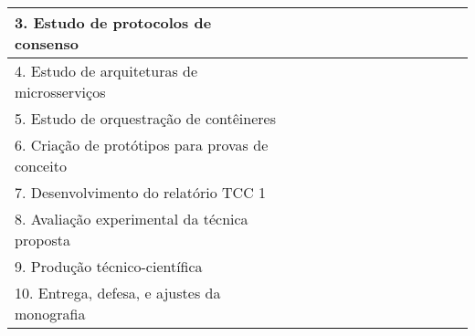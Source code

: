 \begin{table}[!htb]
\begin{center}
{\begin{tabular}{|l|l|l|l|l|l|l|l|l|}
3. Estudo de protocolos de consenso

& ~ & ~ & \cellcolor{gray!25} & ~ & ~ & ~ & ~ & ~ \\ \hline

4. Estudo de arquiteturas de microsserviços

& ~ & ~ & ~ & \cellcolor{gray!25} & ~ & ~ & ~ & ~ \\ \hline

5. Estudo de orquestração de contêineres

& ~ & ~ & ~ & \cellcolor{gray!25} & ~ & ~ & ~ & ~ \\ \hline

6. Criação de protótipos para provas de conceito

& ~ & ~ & ~ & ~ & \cellcolor{blue!25} & \cellcolor{blue!25} & \cellcolor{blue!25} & ~ \\ \hline

7. Desenvolvimento do relatório TCC 1

& \cellcolor{gray!25} & \cellcolor{gray!25} & \cellcolor{gray!25} & \cellcolor{gray!25} & ~ & ~ & ~ & ~ \\ \hline

8. Avaliação experimental da técnica proposta

& ~ & ~ & ~ & ~ & \cellcolor{blue!25} & \cellcolor{blue!25} & \cellcolor{blue!25} & ~ \\ \hline

9. Produção técnico-científica %

& \cellcolor{gray!25} & \cellcolor{gray!25} & \cellcolor{gray!25} & \cellcolor{gray!25} & \cellcolor{blue!25} & \cellcolor{blue!25} & \cellcolor{blue!25} & \cellcolor{blue!25} \\ \hline

10. Entrega, defesa, e ajustes da monografia

& ~ & ~ & ~ & ~ & ~ & \cellcolor{blue!25} & \cellcolor{blue!25} & \cellcolor{blue!25} \\ \hline

\end{tabular}
}
\end{center}
\label{tab:cronograma}
\end{table}

